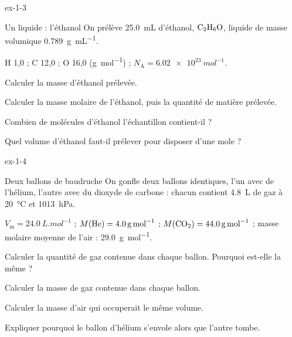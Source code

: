 \begin{blocLivre}{ex-1-3}
\begin{exercice}[1]{Un liquide : l'éthanol}
On prélève \qty{25,0}{mL} d'éthanol, $\ce{C2H6O}$, liquide de masse volumique \qty{0,789}{g.mL^{-1}}.
\begin{donnees}
H 1,0 ; C 12,0 ; O 16,0 (\unit{g.mol^{-1}}) ; $N_\mathrm{A}=\qty{6,02e23}{mol^{-1}}$.
\end{donnees}
\begin{questions}
\item Calculer la masse d'éthanol prélevée.
\item Calculer la masse molaire de l'éthanol, puis la quantité de matière prélevée.
\item Combien de molécules d'éthanol l'échantillon contient-il ?
\item Quel volume d'éthanol faut-il prélever pour disposer d'une mole ?
\end{questions}
\end{exercice}
\end{blocLivre}
\begin{blocLivre}{ex-1-4}
\begin{exercice}[1]{Deux ballons de baudruche}
On gonfle deux ballons identiques, l'un avec de l'hélium, l'autre avec du dioxyde de carbone : chacun contient \qty{4,8}{L} de
gaz à \qty{20}{\degreeCelsius} et \qty{1013}{hPa}.
\begin{donnees}
$V_\mathrm{m}=\qty{24,0}{L.mol^{-1}}$ ; $M(\ce{He})=\qty{4,0}{g.mol^{-1}}$ ; $M(\ce{CO2})=\qty{44,0}{g.mol^{-1}}$ ; masse molaire moyenne de l'air : \qty{29,0}{g.mol^{-1}}.
\end{donnees}
\begin{questions}
\item Calculer la quantité de gaz contenue dans chaque ballon. Pourquoi est-elle la même ?
\item Calculer la masse de gaz contenue dans chaque ballon.
\item Calculer la masse d'air qui occuperait le même volume.
\item Expliquer pourquoi le ballon d'hélium s'envole alors que l'autre tombe.
\end{questions}
\end{exercice}
\end{blocLivre}
